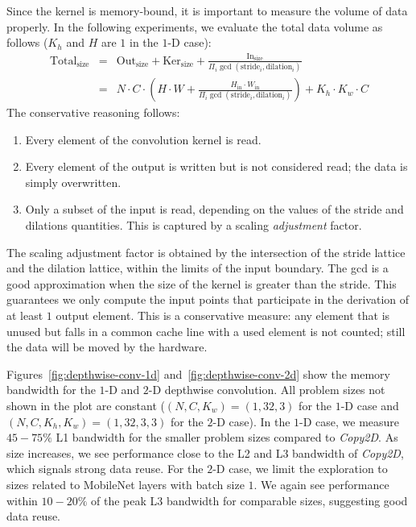 Since the kernel is memory-bound, it is important to measure the volume of data properly.
In the following experiments, we evaluate the total data volume as follows ($K_h$ and $H$ are $1$ in the $1$-D case):
\begin{equation*}
\begin{array}{lll}
\mathrm{Total}_{\mathrm{size}} &=& \mathrm{Out}_{\mathrm{size}} + \mathrm{Ker}_{\mathrm{size}} + \frac{\mathrm{In}_{\mathrm{size}}}{\Pi_i \gcd(\mathrm{stride}_i, \mathrm{dilation}_i)} \\
           &=& N\cdot C\cdot 
                \left(H\cdot W + \frac{H_{\mathrm{in}} \cdot W_{\mathrm{in}}}{\Pi_i \gcd(\mathrm{stride}_i, \mathrm{dilation}_i)}\right) + K_h\cdot K_w\cdot C 
\end{array}
\end{equation*}
The conservative reasoning follows:
\begin{enumerate}
    \item Every element of the convolution kernel is read.
    \item Every element of the output is written but is not considered read; the data is simply overwritten.
    \item Only a subset of the input is read, depending on the values of the stride and dilations quantities. This is captured by a scaling \emph{adjustment} factor.
\end{enumerate}
The scaling adjustment factor is obtained by the intersection of the stride lattice and the dilation lattice, within the limits of the input boundary.
The gcd is a good approximation when the size of the kernel is greater than the stride.
This guarantees we only compute the input points that participate in the derivation of at least $1$ output element.
This is a conservative measure: any element that is unused but falls in a common cache line with a used element is not counted; still the data will be moved by the hardware.

Figures~\ref{fig:depthwise-conv-1d} and~\ref{fig:depthwise-conv-2d} show the memory bandwidth for the $1$-D and $2$-D depthwise convolution.
All problem sizes not shown in the plot are constant ($(N,C,K_w)=(1,32,3)$ for the $1$-D case and $(N,C,K_h,K_w)=(1,32,3,3)$ for the $2$-D case).
In the $1$-D case, we measure $45-75\%$ L1 bandwidth for the smaller problem sizes compared to \emph{Copy2D}.
As size increases, we see performance close to the L2 and L3 bandwidth of \emph{Copy2D}, which signals strong data reuse.
For the $2$-D case, we limit the exploration to sizes related to MobileNet layers with batch size $1$. 
We again see performance within $10-20\%$ of the peak L3 bandwidth for comparable sizes, suggesting good data reuse.

